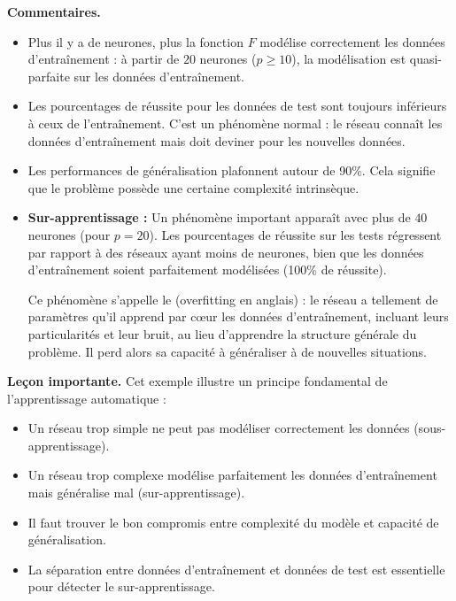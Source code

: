 \textbf{Commentaires.} 
\begin{itemize}
	\item Plus il y a de neurones, plus la fonction $F$ modélise correctement les données d'entraînement : à partir de $20$ neurones ($p\ge10$), la modélisation est quasi-parfaite sur les données d'entraînement.
	
	\item Les pourcentages de réussite pour les données de test sont toujours inférieurs à ceux de l'entraînement. C'est un phénomène normal : le réseau \og{}connaît\fg{} les données d'entraînement mais doit \og{}deviner\fg{} pour les nouvelles données.
	
	\item Les performances de généralisation plafonnent autour de 90\%. Cela signifie que le problème possède une certaine complexité intrinsèque.
	
	\item \textbf{Sur-apprentissage :} Un phénomène important apparaît avec plus de $40$ neurones (pour $p=20$). Les pourcentages de réussite sur les tests régressent par rapport à des réseaux ayant moins de neurones, bien que les données d'entraînement soient parfaitement modélisées (100\% de réussite). 
	
	Ce phénomène s'appelle le  (overfitting en anglais) : le réseau a tellement de paramètres qu'il \og{}apprend par cœur\fg{} les données d'entraînement, incluant leurs particularités et leur bruit, au lieu d'apprendre la structure générale du problème. Il perd alors sa capacité à généraliser à de nouvelles situations.
\end{itemize}

\textbf{Leçon importante.} Cet exemple illustre un principe fondamental de l'apprentissage automatique : 
\begin{itemize}
	\item Un réseau trop simple ne peut pas modéliser correctement les données (sous-apprentissage).
	\item Un réseau trop complexe modélise parfaitement les données d'entraînement mais généralise mal (sur-apprentissage).
	\item Il faut trouver le bon compromis entre complexité du modèle et capacité de généralisation.
	\item La séparation entre données d'entraînement et données de test est essentielle pour détecter le sur-apprentissage.
\end{itemize}









